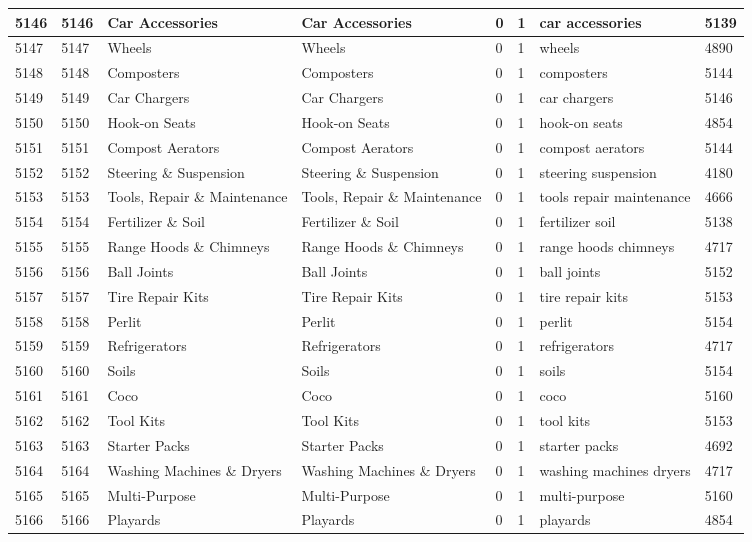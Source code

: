 \begin{longtable}{|l|l|l|l|l|l|l|l|}
5146 & 5146 & Car Accessories & Car Accessories & 0 & 1 & car accessories & 5139 \\ \hline 
5147 & 5147 & Wheels & Wheels & 0 & 1 & wheels & 4890 \\ \hline 
5148 & 5148 & Composters & Composters & 0 & 1 & composters & 5144 \\ \hline 
5149 & 5149 & Car Chargers & Car Chargers & 0 & 1 & car chargers & 5146 \\ \hline 
5150 & 5150 & Hook-on Seats & Hook-on Seats & 0 & 1 & hook-on seats & 4854 \\ \hline 
5151 & 5151 & Compost Aerators & Compost Aerators & 0 & 1 & compost aerators & 5144 \\ \hline 
5152 & 5152 & Steering \& Suspension & Steering \& Suspension & 0 & 1 & steering suspension & 4180 \\ \hline 
5153 & 5153 & Tools, Repair \& Maintenance & Tools, Repair \& Maintenance & 0 & 1 & tools repair maintenance & 4666 \\ \hline 
5154 & 5154 & Fertilizer \& Soil & Fertilizer \& Soil & 0 & 1 & fertilizer soil & 5138 \\ \hline 
5155 & 5155 & Range Hoods \& Chimneys & Range Hoods \& Chimneys & 0 & 1 & range hoods chimneys & 4717 \\ \hline 
5156 & 5156 & Ball Joints & Ball Joints & 0 & 1 & ball joints & 5152 \\ \hline 
5157 & 5157 & Tire Repair Kits & Tire Repair Kits & 0 & 1 & tire repair kits & 5153 \\ \hline 
5158 & 5158 & Perlit & Perlit & 0 & 1 & perlit & 5154 \\ \hline 
5159 & 5159 & Refrigerators & Refrigerators & 0 & 1 & refrigerators & 4717 \\ \hline 
5160 & 5160 & Soils & Soils & 0 & 1 & soils & 5154 \\ \hline 
5161 & 5161 & Coco & Coco & 0 & 1 & coco & 5160 \\ \hline 
5162 & 5162 & Tool Kits & Tool Kits & 0 & 1 & tool kits & 5153 \\ \hline 
5163 & 5163 & Starter Packs & Starter Packs & 0 & 1 & starter packs & 4692 \\ \hline 
5164 & 5164 & Washing Machines \& Dryers & Washing Machines \& Dryers & 0 & 1 & washing machines dryers & 4717 \\ \hline 
5165 & 5165 & Multi-Purpose & Multi-Purpose & 0 & 1 & multi-purpose & 5160 \\ \hline 
5166 & 5166 & Playards & Playards & 0 & 1 & playards & 4854 \\ \hline 

\end{longtable}

